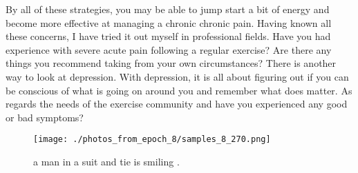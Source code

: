 \documentclass{article}%
\begin{document}
By all of these strategies, you may be able to jump start a bit of energy and become more effective at managing a chronic chronic pain.\newline%
Having known all these concerns, I have tried it out myself in professional fields.\newline%
Have you had experience with severe acute pain following a regular exercise? Are there any things you recommend taking from your own circumstances?\newline%
There is another way to look at depression. With depression, it is all about figuring out if you can be conscious of what is going on around you and remember what does matter.\newline%
As regards the needs of the exercise community and have you experienced any good or bad symptoms?\newline%

%


\begin{figure}[h!]%
\centering%
\texttt{[image: ./photos\_from\_epoch\_8/samples\_8\_270.png]}%
\caption{a man in a suit and tie is smiling .}%
\end{figure}

%
\end{document}
